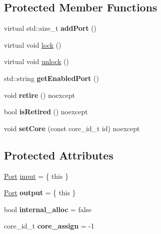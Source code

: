 \subsection*{Protected Member Functions}
\begin{DoxyCompactItemize}
\item 
\hypertarget{classraft_1_1kernel_ab206ff6ee1b729ab8875e181cbef227f}{}\label{classraft_1_1kernel_ab206ff6ee1b729ab8875e181cbef227f} 
virtual std\+::size\+\_\+t {\bfseries add\+Port} ()
\item 
virtual void \hyperlink{classraft_1_1kernel_abd7f3bf1f689840f7d61f472f520c258}{lock} ()
\item 
virtual void \hyperlink{classraft_1_1kernel_a7966dcabb0ed65ac52f6f78918256861}{unlock} ()
\item 
\hypertarget{classraft_1_1kernel_ad463ccfdb7d7e5360cba78bec277cbfe}{}\label{classraft_1_1kernel_ad463ccfdb7d7e5360cba78bec277cbfe} 
std\+::string {\bfseries get\+Enabled\+Port} ()
\item 
\hypertarget{classraft_1_1kernel_a0615a961de9038101c266e69fe2994ca}{}\label{classraft_1_1kernel_a0615a961de9038101c266e69fe2994ca} 
void {\bfseries retire} () noexcept
\item 
\hypertarget{classraft_1_1kernel_a41f090e0b3a4cf96471207155f6af80a}{}\label{classraft_1_1kernel_a41f090e0b3a4cf96471207155f6af80a} 
bool {\bfseries is\+Retired} () noexcept
\item 
\hypertarget{classraft_1_1kernel_a070219cf511c97848218a3431952395c}{}\label{classraft_1_1kernel_a070219cf511c97848218a3431952395c} 
void {\bfseries set\+Core} (const core\+\_\+id\+\_\+t id) noexcept
\end{DoxyCompactItemize}
\subsection*{Protected Attributes}
\begin{DoxyCompactItemize}
\item 
\hyperlink{class_port}{Port} \hyperlink{classraft_1_1kernel_a6edbe35a56409d402e719b3ac36d6554}{input} = \{ this \}
\item 
\hypertarget{classraft_1_1kernel_a1c65cc76ecaa8880ba527e5a146ca4ba}{}\label{classraft_1_1kernel_a1c65cc76ecaa8880ba527e5a146ca4ba} 
\hyperlink{class_port}{Port} {\bfseries output} = \{ this \}
\item 
\hypertarget{classraft_1_1kernel_afc8b7b8a99c538a5f741309730832fc4}{}\label{classraft_1_1kernel_afc8b7b8a99c538a5f741309730832fc4} 
bool {\bfseries internal\+\_\+alloc} = false
\item 
\hypertarget{classraft_1_1kernel_af754bdc01acf6eea572d0ddcd89b568f}{}\label{classraft_1_1kernel_af754bdc01acf6eea572d0ddcd89b568f} 
core\+\_\+id\+\_\+t {\bfseries core\+\_\+assign} = -\/1
\end{DoxyCompactItemize}
